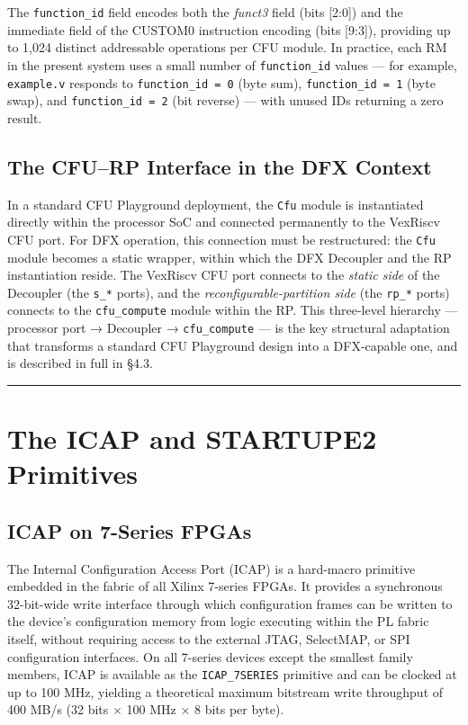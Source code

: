 The \texttt{function\_id} field encodes both the \textit{funct3} field (bits [2:0]) and the immediate field of the CUSTOM0 instruction encoding (bits [9:3]), providing up to 1,024 distinct addressable operations per CFU module. In practice, each RM in the present system uses a small number of \texttt{function\_id} values — for example, \texttt{example.v} responds to \texttt{function\_id = 0} (byte sum), \texttt{function\_id = 1} (byte swap), and \texttt{function\_id = 2} (bit reverse) — with unused IDs returning a zero result.

\subsection{The CFU–RP Interface in the DFX Context}

In a standard CFU Playground deployment, the \texttt{Cfu} module is instantiated directly within the processor SoC and connected permanently to the VexRiscv CFU port. For DFX operation, this connection must be restructured: the \texttt{Cfu} module becomes a static wrapper, within which the DFX Decoupler and the RP instantiation reside. The VexRiscv CFU port connects to the \textit{static side} of the Decoupler (the \texttt{s\_*} ports), and the \textit{reconfigurable-partition side} (the \texttt{rp\_*} ports) connects to the \texttt{cfu\_compute} module within the RP. This three-level hierarchy — processor port → Decoupler → \texttt{cfu\_compute} — is the key structural adaptation that transforms a standard CFU Playground design into a DFX-capable one, and is described in full in §4.3.

\vspace{0.4em}\hrule\vspace{0.4em}

\section{The ICAP and STARTUPE2 Primitives}

\subsection{ICAP on 7-Series FPGAs}

The Internal Configuration Access Port (ICAP) is a hard-macro primitive embedded in the fabric of all Xilinx 7-series FPGAs. It provides a synchronous 32-bit-wide write interface through which configuration frames can be written to the device's configuration memory from logic executing within the PL fabric itself, without requiring access to the external JTAG, SelectMAP, or SPI configuration interfaces. On all 7-series devices except the smallest family members, ICAP is available as the \texttt{ICAP\_7SERIES} primitive and can be clocked at up to 100 MHz, yielding a theoretical maximum bitstream write throughput of 400 MB/s (32 bits × 100 MHz × 8 bits per byte).

